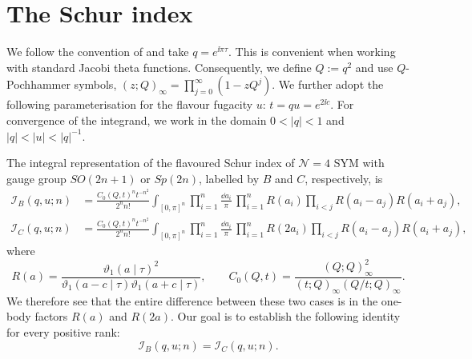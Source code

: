 \section{The Schur index}
\label{sec:schur}
We follow the convention of \cite{Bourdier:2015wda} and take $q=e^{\ii\pi\tau}$.
This is convenient when working with standard Jacobi theta functions.
Consequently, we define $Q:=q^2$ and use $Q$-Pochhammer symbols,
$(z;Q)_\infty=\prod_{j=0}^{\infty}(1-zQ^j)$. We further adopt the following
parameterisation for the flavour fugacity $u$: $t=qu=e^{2\ii c}$. For
convergence of the integrand, we work in the domain $0<|q|<1$ and
$|q|<|u|<|q|^{-1}$.

The integral representation of the flavoured Schur index of $\mathcal N=4$ SYM
with gauge group $SO(2n+1)$ or $Sp(2n)$, labelled by $B$ and $C$,
respectively, is~\cite{SpiridonovVartanov2012,Du:2023pbn}
\begin{align}
  \mathcal I_B(q,u;n)
  &=\frac{C_0(Q,t)^n t^{-n^2}}{2^n n!}
  \int_{[0,\pi]^n}\prod_{i=1}^n\frac{\dd a_i}{\pi}\,
  \prod_{i=1}^n R(a_i)\prod_{i<j}R(a_i-a_j)R(a_i+a_j),
  \label{eq:root-integrals}\\
  \mathcal I_C(q,u;n)
  &=\frac{C_0(Q,t)^n t^{-n^2}}{2^n n!}
  \int_{[0,\pi]^n}\prod_{i=1}^n\frac{\dd a_i}{\pi}\,
  \prod_{i=1}^n R(2a_i)\prod_{i<j}R(a_i-a_j)R(a_i+a_j),
  \label{eq:root-C}
\end{align}
where
\begin{equation}
  R(a)=\frac{\vartheta_1(a\mid\tau)^2}
  {\vartheta_1(a-c\mid\tau)\vartheta_1(a+c\mid\tau)}, \qquad
  C_0(Q,t)
  =\frac{(Q;Q)_\infty^2}{(t;Q)_\infty(Q/t;Q)_\infty}.
  \label{eq:C0}
\end{equation}
We therefore see that the entire difference between these two cases is in the
one-body factors $R(a)$ and $R(2a)$. Our goal is to establish the following
identity for every positive rank:
\begin{equation}
  \mathcal I_B(q,u;n)=\mathcal I_C(q,u;n).
  \label{eq:duality}
\end{equation}
